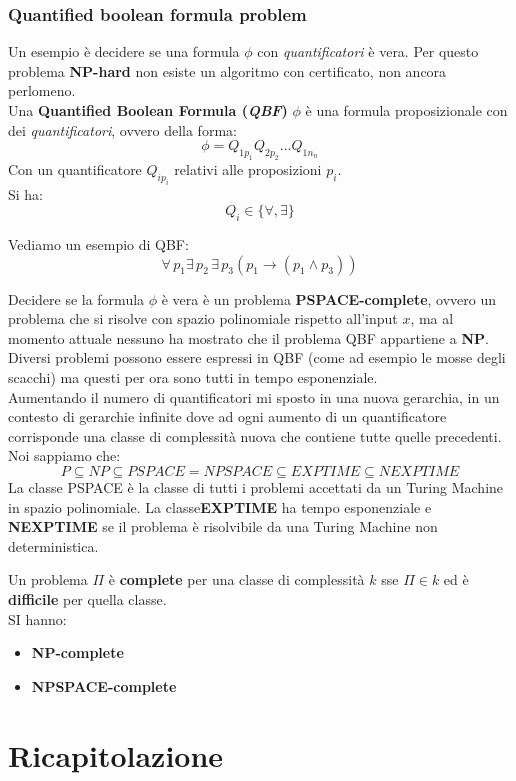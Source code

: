 														\subsubsection{Quantified boolean formula problem}
														Un esempio è decidere se una formula $\phi$ con \textit{quantificatori} è
														vera. Per questo problema \textbf{NP-hard} non esiste un algoritmo con
														certificato, non ancora perlomeno.\\
														Una \textbf{Quantified Boolean Formula (\textit{QBF})} $\phi$ è una formula
														proposizionale con dei \textit{quantificatori}, ovvero della forma:
														\[\phi=Q_{1p_1}Q_{2p_2}\ldots Q_{1n_n}\]
														Con un quantificatore $Q_{ip_i}$ relativi alle proposizioni $p_i$.\\
														Si ha:
														\[Q_i\in\{\forall,\exists\}\]
														\begin{esempio}
															Vediamo un esempio di QBF:
															\[\forall\, p_1\exists\,p_2\,\exists\, p_3(p_1\to(p_1\land p_3))\]
														\end{esempio}
														Decidere se la formula $\phi$ è vera è un problema \textbf{PSPACE-complete},
														ovvero un problema che si risolve con spazio polinomiale rispetto all'input $x$,
														ma al momento attuale nessuno ha mostrato che il problema QBF appartiene a
														\textbf{NP}.\\
														Diversi problemi possono essere espressi in QBF (come ad esempio le mosse degli
														scacchi) ma questi per ora sono tutti in tempo esponenziale.\\
														Aumentando il numero di quantificatori mi sposto in una nuova gerarchia, in un
														contesto di gerarchie infinite dove ad ogni aumento di un quantificatore
														corrisponde una classe di complessità nuova che contiene tutte quelle
														precedenti.\\
														Noi sappiamo che:
														\[P\subseteq NP\subseteq PSPACE=NPSPACE\subseteq EXPTIME\subseteq NEXPTIME\]
														La classe PSPACE è la classe di tutti i problemi accettati da un Turing Machine
														in spazio polinomiale. La classe\textbf{EXPTIME} ha tempo esponenziale e
														\textbf{NEXPTIME} se il problema è risolvibile da una Turing Machine non
														deterministica.
														\begin{definizione}
															Un problema $\Pi$ è \textbf{complete} per una classe di complessità $k$ sse 
															$\Pi\in k$ ed è \textbf{difficile} per quella classe.\\
															SI hanno:
															\begin{itemize}
																\item \textbf{NP-complete}
																\item \textbf{NPSPACE-complete}
															\end{itemize}
														\end{definizione}
							\newpage
\section{Ricapitolazione}							

								


